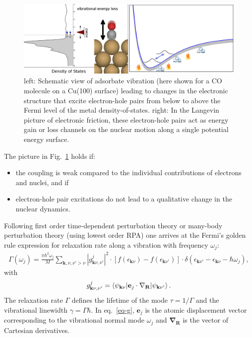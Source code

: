 \begin{figure}
 \centering\includegraphics{friction.png}
 \caption{\label{fig:friction} left: Schematic view of adsorbate vibration (here shown for a CO molecule on a Cu(100) surface) leading to changes in the electronic structure that excite electron-hole pairs from below to above the Fermi level of the metal density-of-states. right: In the Langevin picture of electronic friction, these electron-hole pairs act as energy gain or loss channels on the nuclear motion along a single potential energy surface.}
\end{figure}

The picture in Fig.~\ref{fig:friction} holds if:
\begin{itemize}
 \item the coupling is weak compared to the individual contributions of electrons and nuclei, and if
 \item electron-hole pair excitations do not lead to a qualitative change in the nuclear dynamics.
\end{itemize}

Following first order time-dependent perturbation theory or many-body perturbation theory (using  lowest order RPA) one arrives at the Fermi's golden rule expression for relaxation rate along a vibration with frequency $\omega_j$:
\begin{align}\label{eq-Gamma}
 \Gamma(\omega_{j}) =\frac{\pi\hbar^2\omega_{j}}{M}\sum_{\mathbf{k},\nu,\nu'>\nu} 
    |g_{\mathbf{k}\nu,\nu'}^{j}|^2 \cdot
   [f(\epsilon_{\mathbf{k}\nu})-f(\epsilon_{\mathbf{k}\nu'})]\cdot \delta(\epsilon_{\mathbf{k}\nu'}-\epsilon_{\mathbf{k}\nu}-\hbar\omega_{j}),
\end{align}
with 
\begin{align}\label{eq-g}
g_{\mathbf{k}\nu,\nu'}^{j} = \braket{\psi_{\mathbf{k}\nu}|\mathbf{e}_{j}\cdot\mathbf{\nabla}_{\mathbf{R}}|\psi_{\mathbf{k}\nu'}}.
\end{align}
The relaxation rate $\Gamma$ defines the lifetime of the mode $\tau=1/\Gamma$ and the vibrational linewidth $\gamma = \Gamma\hbar$. In eq.~\ref{eq-g}, $\mathbf{e}_{j}$ is the atomic displacement vector corresponding to the vibrational normal mode $\omega_{j}$ and $\mathbf{\nabla}_{\mathbf{R}}$ is the vector of Cartesian derivatives. 

